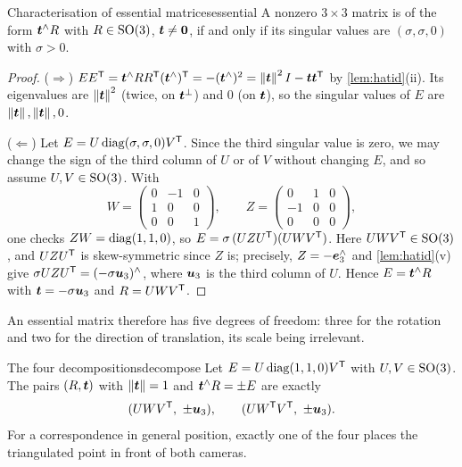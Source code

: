 \begin{theorem}{Characterisation of essential matrices}{essential}
A nonzero $3\times3$ matrix is of the form $\bm{t}^{\wedge}R$ with
$R\in\mathrm{SO}(3)$, $\bm{t}\neq\bm{0}$, if and only if its singular values are
$(\sigma,\sigma,0)$ with $\sigma>0$.
\end{theorem}

\begin{proof}
($\Rightarrow$) $EE^{\mathsf{T}}=\bm{t}^{\wedge}RR^{\mathsf{T}}(\bm{t}^{\wedge})^{\mathsf{T}}=
-(\bm{t}^{\wedge})^2=\left\lVert \bm{t}\right\rVert^2I-\bm{t}\bm{t}^{\mathsf{T}}$ by
\cref{lem:hatid}(ii). Its eigenvalues are $\left\lVert \bm{t}\right\rVert^2$ (twice, on
$\bm{t}^\perp$) and $0$ (on $\bm{t}$), so the singular values of $E$
are $\left\lVert \bm{t}\right\rVert,\left\lVert \bm{t}\right\rVert,0$.

($\Leftarrow$) Let $E=U\operatorname{diag}(\sigma,\sigma,0)V^{\mathsf{T}}$. Since the third
singular value is zero, we may change the sign of the third column of
$U$ or of $V$ without changing $E$, and so assume $U,V\in\mathrm{SO}(3)$. With
\[
W=\begin{pmatrix}0&-1&0\\1&0&0\\0&0&1\end{pmatrix},\qquad
Z=\begin{pmatrix}0&1&0\\-1&0&0\\0&0&0\end{pmatrix},
\]
one checks $ZW=\operatorname{diag}(1,1,0)$, so $E=\sigma\,(UZU^{\mathsf{T}})(UWV^{\mathsf{T}})$. Here
$UWV^{\mathsf{T}}\in\mathrm{SO}(3)$, and $UZU^{\mathsf{T}}$ is skew-symmetric since $Z$ is; precisely,
$Z=-\bm{e}_3^{\wedge}$ and \cref{lem:hatid}(v) give $\sigma UZU^{\mathsf{T}}=
(-\sigma\bm{u}_3)^{\wedge}$, where $\bm{u}_3$ is the third column of
$U$. Hence $E=\bm{t}^{\wedge}R$ with $\bm{t}=-\sigma\bm{u}_3$ and
$R=UWV^{\mathsf{T}}$.
\end{proof}

An essential matrix therefore has five degrees of freedom: three for the
rotation and two for the direction of translation, its scale being
irrelevant.

\begin{proposition}{The four decompositions}{decompose}
Let $E=U\operatorname{diag}(1,1,0)V^{\mathsf{T}}$ with $U,V\in\mathrm{SO}(3)$. The pairs $(R,\bm{t})$
with $\left\lVert \bm{t}\right\rVert=1$ and $\bm{t}^{\wedge}R=\pm E$ are exactly
\[
(UWV\T,\ \pm\vect{u}_3),\qquad(UW\T V\T,\ \pm\vect{u}_3).
\]
For a correspondence in general position, exactly one of the four
places the triangulated point in front of both cameras.
\end{proposition}

